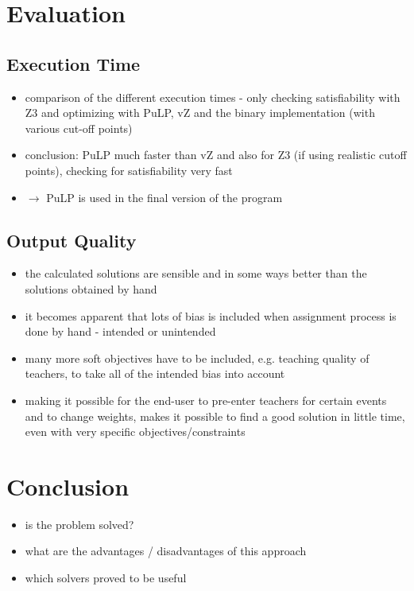 \documentclass[]{article}
\begin{document}
\section{Evaluation}
\subsection{Execution Time}
\begin{itemize}
	\item comparison of the different execution times - only checking satisfiability with Z3 and optimizing with PuLP, vZ and the binary implementation (with various cut-off points)
	\item conclusion: PuLP much faster than vZ and also for Z3 (if using realistic cutoff points), checking for satisfiability very fast
	\item $\rightarrow$ PuLP is used in the final version of the program
\end{itemize}

\subsection{Output Quality}
\begin{itemize}
	\item the calculated solutions are sensible and in some ways better than the solutions obtained by hand
	\item it becomes apparent that lots of bias is included when assignment process is done by hand - intended or unintended
	\item many more soft objectives have to be included, e.g. teaching quality of teachers, to take all of the intended bias into account
	\item making it possible for the end-user to pre-enter teachers for certain events  and to change weights, makes it possible to find a good solution in little time, even with very specific objectives/constraints
\end{itemize}



\section{Conclusion}
\begin{itemize}
	\item is the problem solved?
	\item what are the advantages / disadvantages of this approach
	\item which solvers proved to be useful
	
\end{itemize}
\end{document}
